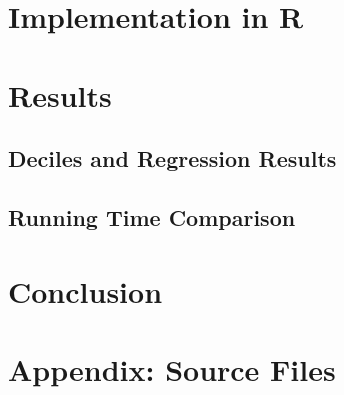 \documentclass{article}
\begin{document}
\section{Implementation in R}

\section{Results}

\subsection{Deciles and Regression Results}

\subsection{Running Time Comparison}

\section{Conclusion}








\pagebreak
\section*{Appendix: Source Files}
%
%
%


\end{document}
